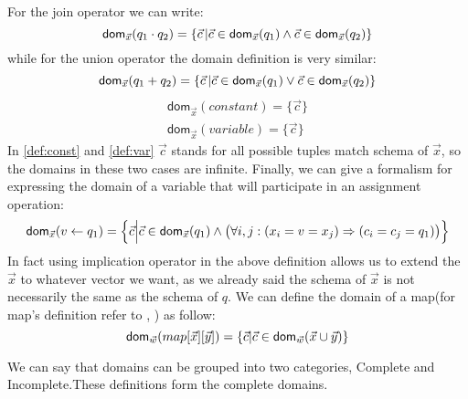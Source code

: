 \documentclass[12pt]{article}
\newcommand{\dom}{\textsf{dom}}
\begin{document}
For the join operator we can write:
\begin{equation}
\label{def:join}
\text{\dom{}}_{\vec{x}}(q_{1}\cdot q_{2})=\{\vec{c}\,|\vec{c}\in\text{\dom{}}_{\vec{x}}(q_{1})\land\vec{c}\in\text{\dom{}}_{\vec{x}}(q_{2})\}
\end{equation}
while for the union operator the domain definition is very similar:
\begin{equation}
\label{def:plus}
\text{\dom{}}_{\vec{x}}(q_{1}+ q_{2})=\{\vec{c}\,|\vec{c}\in\text{\dom{}}_{\vec{x}}(q_{1})\lor\vec{c}\in\text{\dom{}}_{\vec{x}}(q_{2})\}
\end{equation}
\begin{eqnarray}
\dom{}_{\vec x}(constant)=\Big\{\vec c\Big\}\label{def:const}\\
\dom{}_{\vec x}(variable)=\Big\{\vec c\Big\}\label{def:var}
\end{eqnarray}
In \eqref{def:const} and \eqref{def:var}  $\vec{c}$ stands for all possible tuples match schema of $\vec{x}$, so the domains in these two cases are infinite. 
Finally, we can give a formalism for expressing the domain of a variable that will participate in an assignment operation:
\begin{equation}
\label{assign2}
\text{\dom{}}_{\vec{x}}(v\gets q_{1})=\Big\{\vec{c}\Big|\vec{c}\in\text{\dom{}}_{\vec{x}}(q_{1})\land \big(\forall i,j: (x_{i}=v=x_{j})\Rightarrow(c_{i}=c_{j}=q_{1})\big)\Big\}
\end{equation}
In fact using implication operator in the above definition allows us to extend the $\vec{x}$ to whatever vector we want, as we already said the schema of $\vec{x}$ is not necessarily the same as the schema of $q$. %
We can define the domain of a map(for map's definition refer to \cite{1}, \cite{2}) as follow:
\begin{equation}
\label{def:map}
\text{\dom}_{\vec{w}}(map[\vec{x}][\vec{y}])=\{\vec{c}|\vec{c}\in\text{\dom}_{\vec{w}}(\vec{x}\cup\vec{y})\}
\end{equation}

We can say that domains can be grouped into two categories, Complete and Incomplete.These definitions form the complete domains.
\end{document}

